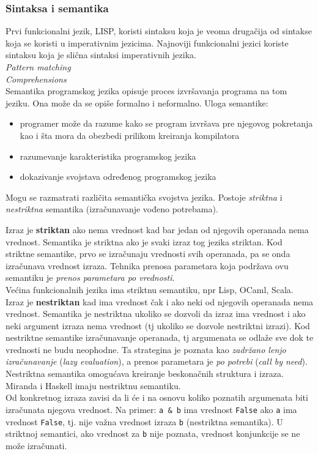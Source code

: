 \documentclass[../main.tex]{subfiles}
\begin{document}
	   
	   \subsubsection{Sintaksa i semantika}								%
	   
	   Prvi funkcionalni jezik, LISP, koristi sintaksu koja je veoma drugačija od sintakse koja se koristi u imperativnim jezicima. Najnoviji funkcionalni jezici koriste sintaksu koja je slična sintaksi imperativnih jezika. 
	   \\
	   {\it Pattern matching} 
	   \\
	   {\it Comprehensions}
	   \\
	   Semantika programskog jezika opisuje proces izvršavanja programa na tom jeziku. Ona može da se opiše formalno i neformalno. Uloga semantike:
	   \begin{itemize}
	   \item programer može da razume kako se program izvršava pre njegovog pokretanja kao i šta mora da obezbedi prilikom kreiranja kompilatora
	   \item razumevanje karakteristika programskog jezika
	   \item dokazivanje svojstava određenog programskog jezika
	   \end{itemize}
	   Mogu se razmatrati različita semantička svojstva jezika. Postoje {\it striktna} i {\it nestriktna} semantika (izračunavanje vođeno potrebama).
	   
	   \indent Izraz je {\bf striktan} ako nema vrednost kad bar jedan od njegovih operanada nema vrednost. Semantika je striktna ako je svaki izraz tog jezika striktan. Kod striktne semantike, prvo se izračunaju vrednosti svih operanada, pa se onda izračunava vrednost izraza. Tehnika prenosa parametara koja podržava ovu semantiku je {\it prenos parametara po vrednosti}.\\
	   Većina funkcionalnih jezika ima striktnu semantiku, npr Lisp, OCaml, Scala.
	   \\
	   
	   \indent Izraz je {\bf nestriktan} kad ima vrednost čak i ako neki od njegovih operanada nema vrednost. Semantika je nestriktna ukoliko se dozvoli da izraz ima vrednost i ako neki argument izraza nema vrednost (tj ukoliko se dozvole nestriktni izrazi). Kod nestriktne semantike izračunavanje operanada, tj argumenata se odlaže sve dok te vrednosti ne budu neophodne. Ta strategina je poznata kao {\it zadržano lenjo izračunavanje} ({\it lazy evaluation}), a prenos parametara je {\it po potrebi} ({\it call by need}).
	   Nestriktna semantika omogućava kreiranje beskonačnih struktura i izraza.\\
	   Miranda i Haskell imaju nestriktnu semantiku.
	   \\
	   Od konkretnog izraza zavisi da li će i na osnovu koliko poznatih argumenata biti izračunata njegova vrednost. Na primer: \texttt{a \& b} ima vrednost \texttt{False} ako \texttt{a} ima vrednost \texttt{False}, tj. nije važna vrednost izraza \texttt{b} (nestriktna semantika). U striktnoj semantici, ako vrednost za \texttt{b} nije poznata, vrednost konjunkcije se ne može izračunati.
	   
\end{document}
